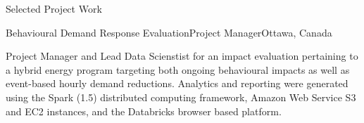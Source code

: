 \documentclass{resume} %
\begin{document}
\begin{rSection}{Selected Project Work}
\begin{rSubsection}{Behavioural Demand Response Evaluation}{}{Project Manager}{Ottawa, Canada}
\item[] Project Manager and Lead Data Scienstist for an impact evaluation pertaining to a hybrid energy program targeting both ongoing behavioural impacts as well as event-based hourly demand reductions. Analytics and reporting were generated using the Spark (1.5) distributed computing framework, Amazon Web Service S3 and EC2 instances, and the Databricks browser based platform. 

\end{rSubsection}





\end{rSection}
\end{document}
